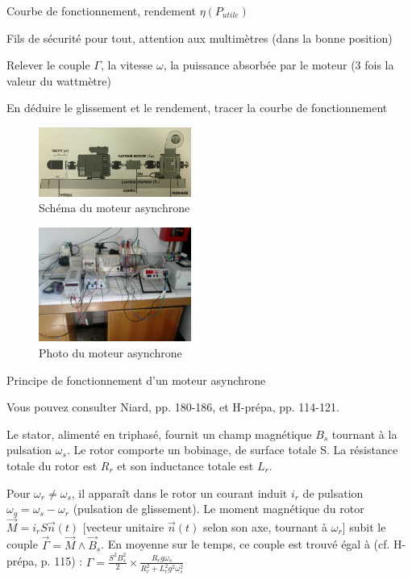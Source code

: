 \documentclass{article}%
\begin{document}
Courbe de fonctionnement, rendement $\eta (P_{utile})$

Fils de sécurité pour tout, attention aux multimètres (dans la bonne position)

Relever le couple $\Gamma$, la vitesse $\omega$, la puissance absorbée par le moteur (3 fois la valeur du wattmètre)

En déduire le glissement et le rendement, tracer la courbe de fonctionnement
\begin{figure}
	\centerline{\includegraphics[width=5cm]{images-exp/Moteur_Asynchrone_Schema.jpg}}
	\caption{Schéma du moteur asynchrone}
\end{figure}
\begin{figure}
	\centerline{\includegraphics[width=5cm]{images-exp/moteur_asynchrone.jpg}}
	\caption{Photo du moteur asynchrone}
\end{figure}

Principe de fonctionnement d'un moteur asynchrone

Vous pouvez consulter Niard, pp. 180-186, et H-prépa, pp. 114-121.

    Le stator, alimenté en triphasé, fournit un champ magnétique $B_s$ tournant à la pulsation $\omega_s$.
    Le rotor comporte un bobinage, de surface totale S. La résistance totale du rotor est $R_r$ et son inductance totale est $L_r$.

Pour $\omega_r\neq\omega_s$, il apparaît dans le rotor un courant induit $i_r$ de pulsation $\omega_g =\omega_s - \omega_r$ (pulsation de glissement). Le moment magnétique du rotor $\vec M = i_r S \vec n(t)$ [vecteur unitaire $\vec n(t)$ selon son axe, tournant à $\omega_r$] subit le couple $\vec{\Gamma}=\vec{M} \wedge \vec{B}_s$. En moyenne sur le temps, ce couple est trouvé égal à (cf. H-prépa, p. 115) :
$\Gamma = \frac{S^2 B_s^2}{2} \times \frac{R_r g \omega_s}{R_r^2 + L_r^2 g^2 \omega_s^2}$
\end{document}
